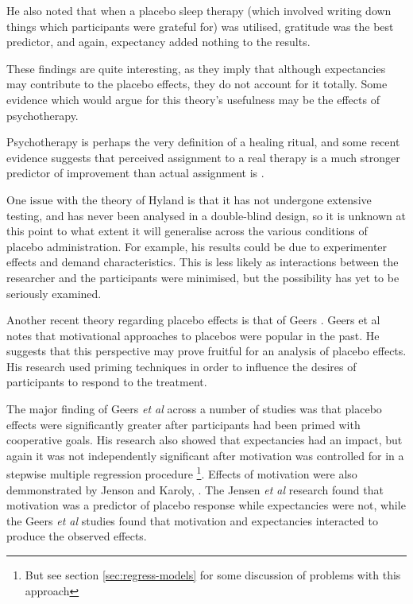 He also noted that when a placebo sleep therapy (which involved writing down things which participants were grateful for) was utilised, gratitude was the best predictor, and again, expectancy added nothing to the results. 

These findings are quite interesting, as they imply that although expectancies may contribute to the placebo effects, they do not account for it totally. Some evidence which would argue for this theory's usefulness may be the effects of psychotherapy. 

Psychotherapy is perhaps the very definition of a healing ritual, and some recent evidence suggests that perceived assignment to a real therapy is a much stronger predictor of improvement than actual assignment is \cite{Bausell2005,Linde2007}.

One issue with the theory of Hyland is that it has not undergone extensive testing, and has never been analysed in a double-blind design, so it is unknown at this point to what extent it will generalise across the various conditions of placebo administration. For example, his results could be due to experimenter effects and demand characteristics. This is less likely as interactions between the researcher and the participants were minimised, but the possibility has yet to be seriously examined. 

Another recent theory regarding placebo effects is that of Geers \cite{Geers2005a}. Geers et al notes that  motivational approaches to placebos were popular in the past.  He suggests that this perspective may prove fruitful for an analysis of placebo effects.   His research used priming techniques in order to influence the desires of  participants to respond to the treatment. 

The major finding of Geers \textit{et al} across a number of studies \cite{Geers2007,Geers2005a} was that placebo effects were significantly greater after participants had been primed with cooperative goals. His research also showed that expectancies had an impact, but again it was not independently significant after motivation was controlled for in a stepwise multiple regression procedure \footnote{But see section \ref{sec:regress-models} for some discussion of problems with this approach}. Effects of motivation were also demmonstrated by Jenson and Karoly, \cite{Jensen1991}. The Jensen \textit{et al }   research found that motivation was a predictor of placebo response while expectancies were not, while the Geers \textit{et al } studies found that motivation and expectancies interacted to produce the observed effects.

